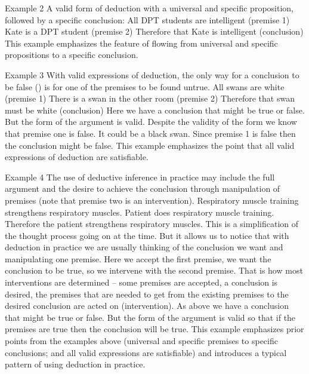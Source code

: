 \documentclass[
]{book}
\begin{document}
Example 2
A valid form of deduction with a universal and specific proposition, followed by a specific conclusion:
All DPT students are intelligent (premise 1)
Kate is a DPT student (premise 2)
Therefore that Kate is intelligent (conclusion)
This example emphasizes the feature of flowing from universal and specific propositions to a specific conclusion.

Example 3
With valid expressions of deduction, the only way for a conclusion to be false () is for one of the premises to be found untrue.
All swans are white (premise 1)
There is a swan in the other room (premise 2)
Therefore that swan must be white (conclusion)
Here we have a conclusion that might be true or false. But the form of the argument is valid. Despite the validity of the form we know that premise one is false. It could be a black swan. Since premise 1 is false then the conclusion might be false. This example emphasizes the point that all valid expressions of deduction are satisfiable.

Example 4
The use of deductive inference in practice may include the full argument and the desire to achieve the conclusion through manipulation of premises (note that premise two is an intervention).
Respiratory muscle training strengthens respiratory muscles.
Patient does respiratory muscle training.
Therefore the patient strengthens respiratory muscles.
This is a simplification of the thought process going on at the time. But it allows us to notice that with deduction in practice we are usually thinking of the conclusion we want and manipulating one premise. Here we accept the first premise, we want the conclusion to be true, so we intervene with the second premise. That is how most interventions are determined -- some premises are accepted, a conclusion is desired, the premises that are needed to get from the existing premises to the desired conclusion are acted on (intervention). As above we have a conclusion that might be true or false. But the form of the argument is valid so that if the premises are true then the conclusion will be true. This example emphasizes prior points from the examples above (universal and specific premises to specific conclusions; and all valid expressions are satisfiable) and introduces a typical pattern of using deduction in practice.
\end{document}
